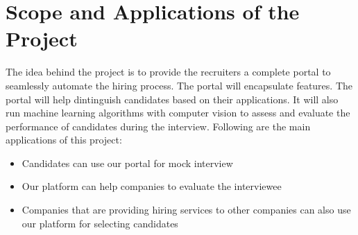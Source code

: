 \section{Scope and Applications of the Project}
The idea behind the project is to provide the recruiters a complete portal to seamlessly automate the hiring process. The portal will encapsulate features. The portal will help dintinguish candidates based on their applications. It will also run machine learning algorithms with computer vision to assess and evaluate the performance of candidates during the interview.
Following are the main applications of this project:
\begin{itemize}
    \item Candidates can use our portal for mock interview
    \item Our platform can help companies to evaluate the interviewee
    \item Companies that are providing hiring services to other companies can also use our platform for selecting candidates
\end{itemize}